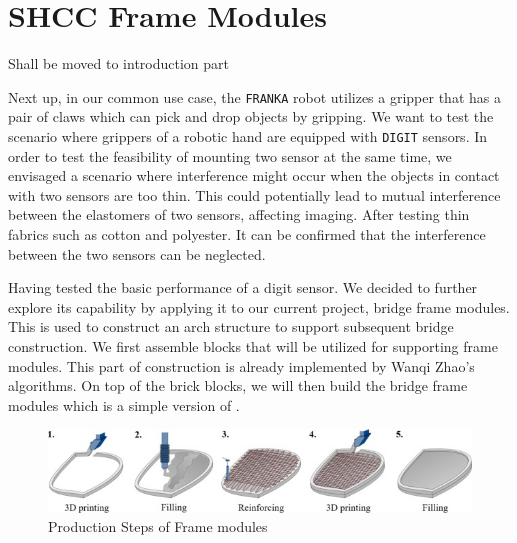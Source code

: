 \section{SHCC Frame Modules}
{\Large\color{red} Shall be moved to introduction part}

Next up, in our common use case, the \texttt{FRANKA} robot utilizes a gripper that has a pair of claws which can pick and drop objects by gripping. We want to test the scenario where grippers of a robotic hand are equipped with \texttt{DIGIT} sensors. In order to test the feasibility of mounting two sensor at the same time, we envisaged a scenario where interference might occur when the objects in contact with two sensors are too thin. This could potentially lead to mutual interference between the elastomers of two sensors, affecting imaging. After testing thin fabrics such as cotton and polyester. It can be confirmed that the interference between the two sensors can be neglected.

Having tested the basic performance of a digit sensor. We decided to further explore its capability by applying it to our current project, bridge frame modules. This is used to construct an arch structure to support subsequent bridge construction. We first assemble blocks that will be utilized for supporting frame modules. This part of construction is already implemented by {\LARGE\color{red} Wanqi Zhao's algorithms}. On top of the brick blocks, we will then build the bridge frame modules which is a simple version of \cite{IVANIUK2022}.

\begin{figure}[t]
	\centering
	\includegraphics[width=1\textwidth]{fig/composites.jpg}
	\caption{Production Steps of Frame modules}
	\label{fig:composite} %
\end{figure}

